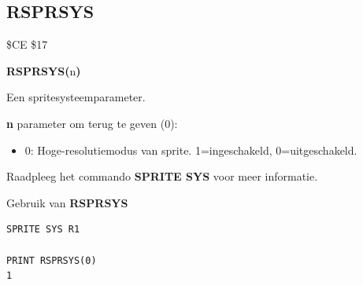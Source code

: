 
\newpage
\subsection{RSPRSYS}
\begin{description}[leftmargin=2cm,style=nextline]
\item [Token:]    \$CE \$17

\item [Formaat:]   {\bf RSPRSYS(}n{\bf)}

\item [Retourneert:]  Een spritesysteemparameter.

                  {\bf n} parameter om terug te geven (0):

                  \begin{itemize}
                     \item 0: Hoge-resolutiemodus van sprite. 1=ingeschakeld, 0=uitgeschakeld.
                  \end{itemize}

\item [Opmerkingen:]  Raadpleeg het commando {\bf SPRITE SYS} voor meer informatie.

\item [Voorbeeld:]  Gebruik van {\bf RSPRSYS}

\begin{tcolorbox}[colback=black,coltext=white]
\verbatimfont{\codefont}
\begin{verbatim}
SPRITE SYS R1

PRINT RSPRSYS(0)
1
\end{verbatim}
\end{tcolorbox}
\end{description}



\newpage
